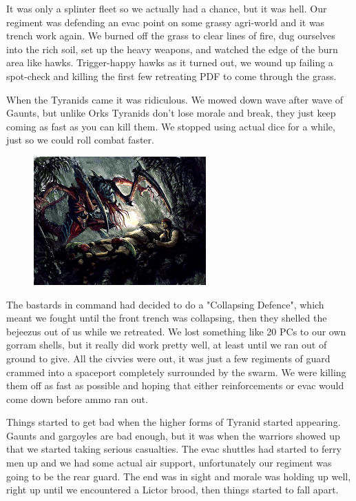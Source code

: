 It was only a splinter fleet so we actually had a chance, but it was hell. 
Our regiment was defending an evac point on some grassy agri-world and it was trench work again. 
We burned off the grass to clear lines of fire, dug ourselves into the rich soil, set up the heavy weapons, and watched the edge of the burn area like hawks.
 Trigger-happy hawks as it turned out, we wound up failing a spot-check and killing the first few retreating PDF to come through the grass. 

When the Tyranids came it was ridiculous. 
We mowed down wave after wave of Gaunts, but unlike Orks Tyranids don't lose morale and break, they just keep coming as fast as you can kill them. %
We stopped using actual dice for a while, just so we could roll combat faster.

\begin{figure}
	\begin{center}
		\includegraphics[width=\figwidth]{pics/1/7.png}
	\end{center}
\end{figure}
The bastards in command had decided to do a "Collapsing Defence", which meant we fought until the front trench was collapsing, then they shelled the bejeezus out of us while we retreated. 
We lost something like 20 PCs to our own gorram shells, but it really did work pretty well, at least until we ran out of ground to give. 
All the civvies were out, it was just a few regiments of guard crammed into a spaceport completely surrounded by the swarm.
We were killing them off as fast as possible and hoping that either reinforcements or evac would come down before ammo ran out.

Things started to get bad when the higher forms of Tyranid started appearing. 
Gaunts and gargoyles are bad enough, but it was when the warriors showed up that we started taking serious casualties. 
The evac shuttles had started to ferry men up and we had some actual air support, unfortunately our regiment was going to be the rear guard. 
The end was in sight and morale was holding up well, right up until we encountered a Lictor brood, then things started to fall apart. 

